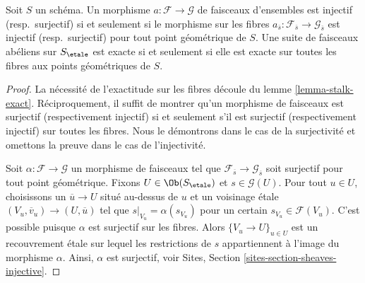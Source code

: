 \begin{theorem}
\label{theorem-exactness-stalks}
Soit $S$ un sch\'ema.
Un morphisme $a : \mathcal{F} \to \mathcal{G}$ de faisceaux d'ensembles est injectif
(resp.\ surjectif) si et seulement si le morphisme sur les fibres
$a_{\overline{s}} : \mathcal{F}_{\overline{s}} \to \mathcal{G}_{\overline{s}}$
est injectif (resp.\ surjectif) pour tout point g\'eom\'etrique de $S$.
Une suite de faisceaux ab\'eliens sur $S_\etale$ est exacte
si et seulement si elle est exacte sur toutes les fibres aux points g\'eom\'etriques de $S$.
\end{theorem}

\begin{proof}
La n\'ecessit\'e de l'exactitude sur les fibres d\'ecoule du
lemme \ref{lemma-stalk-exact}.
R\'eciproquement, il suffit de montrer qu'un morphisme de faisceaux est surjectif
(respectivement injectif) si et seulement s'il est surjectif (respectivement
injectif) sur toutes les fibres. Nous le d\'emontrons dans le cas de la surjectivit\'e et omettons
la preuve dans le cas de l'injectivit\'e.

\medskip\noindent
Soit $\alpha : \mathcal{F} \to \mathcal{G}$ un morphisme de faisceaux tel
que $\mathcal{F}_{\overline{s}} \to \mathcal{G}_{\overline{s}}$
soit surjectif pour tout point g\'eom\'etrique. Fixons
$U \in \Ob(S_\etale)$
et $s \in \mathcal{G}(U)$. Pour tout $u \in U$, choisissons un
$\overline{u} \to U$ situ\'e au-dessus de $u$ et un voisinage \'etale
$(V_u , \overline{v}_u) \to (U, \overline{u})$ tel que
$s|_{V_u} = \alpha(s_{V_u})$ pour un certain
$s_{V_u} \in \mathcal{F}(V_u)$.
C'est possible puisque $\alpha$ est surjectif sur les
fibres. Alors $\{V_u \to U\}_{u \in U}$
est un recouvrement \'etale sur lequel les restrictions de $s$
appartiennent \`a l'image du morphisme $\alpha$.
Ainsi, $\alpha$ est surjectif, voir
Sites, Section \ref{sites-section-sheaves-injective}.
\end{proof}

